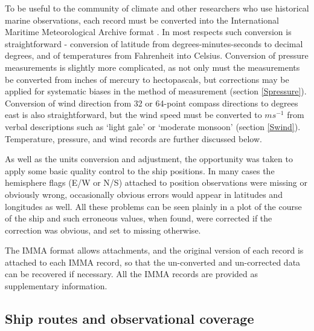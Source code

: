 \documentclass[CP]{copernicus}
\begin{document}
To be useful to the community of climate and other researchers who use historical marine observations, each record must be converted into the International Maritime Meteorological Archive format \citep{woodruff07imma}. In most respects such conversion is straightforward - conversion of latitude from degrees-minutes-seconds to decimal degrees, and of temperatures from Fahrenheit into Celsius. Conversion of pressure measurements is slightly more complicated, as not only must the measurements be converted from inches of mercury to hectopascals, but corrections may be applied for systematic biases in the method of measurement (section \ref{Spressure}). Conversion of wind direction from 32 or 64-point compass directions to degrees east is also straightforward, but the wind speed must be converted to $ms^{-1}$ from verbal descriptions such as `light gale' or `moderate monsoon' (section \ref{Swind}). Temperature, pressure, and wind records are further discussed below.

As well as the units conversion and adjustment, the opportunity was taken to apply some basic quality control to the ship positions. In many cases the hemisphere flags (E/W or N/S) attached to position observations were missing or obviously wrong, occasionally obvious errors would appear in latitudes and longitudes as well. All these problems can be seen plainly in a plot of the course of the ship and such erroneous values, when found, were corrected if the correction was obvious, and set to missing otherwise. 

The IMMA format allows attachments, and the original version of each record is attached to each IMMA record, so that the un-converted and un-corrected data can be recovered if necessary. All the IMMA records are provided as supplementary information.

\subsection{Ship routes and observational coverage}
\end{document}

